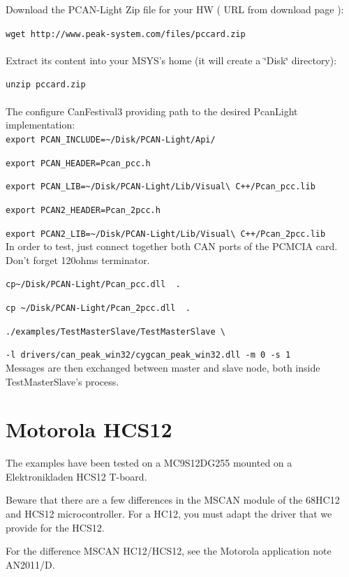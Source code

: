 \documentclass[a4paper,12pt]{book}
\begin{document}
Download the PCAN-Light Zip file for your HW ( URL from download page
):

\texttt{wget http://www.peak-system.com/files/pccard.zip}~\\
\\
Extract its content into your MSYS's home (it will create a \char`\"{}Disk\char`\"{}
directory):

\texttt{unzip pccard.zip}~\\
\\
The configure CanFestival3 providing path to the desired PcanLight
implementation:\\


\texttt{export PCAN\_INCLUDE=\~{ }/Disk/PCAN-Light/Api/}

\texttt{export PCAN\_HEADER=Pcan\_pcc.h}

\texttt{export PCAN\_LIB=\~{ }/Disk/PCAN-Light/Lib/Visual\textbackslash{}
C++/Pcan\_pcc.lib}

\texttt{export PCAN2\_HEADER=Pcan\_2pcc.h}

\texttt{export PCAN2\_LIB=\~{ }/Disk/PCAN-Light/Lib/Visual\textbackslash{}
C++/Pcan\_2pcc.lib}~\\


In order to test, just connect together both CAN ports of the PCMCIA
card. Don't forget 120ohms terminator.

\texttt{cp\~{ }/Disk/PCAN-Light/Pcan\_pcc.dll ~.}

\texttt{cp \~{ }/Disk/PCAN-Light/Pcan\_2pcc.dll ~.}

\texttt{./examples/TestMasterSlave/TestMasterSlave \textbackslash{}}

\texttt{-l drivers/can\_peak\_win32/cygcan\_peak\_win32.dll -m 0 -s
1}~\\


Messages are then exchanged between master and slave node, both inside
TestMasterSlave's process.

\section{Motorola HCS12}
The examples have been tested on a MC9S12DG255 mounted on a
Elektronikladen HCS12 T{}-board.

Beware that there are a few differences in the MSCAN module of the
68HC12 and HCS12 microcontroller. For a HC12, you must adapt the driver
that we provide for \space the HCS12.

For the difference MSCAN HC12/HCS12, see the Motorola application note
AN2011/D.
\end{document}

